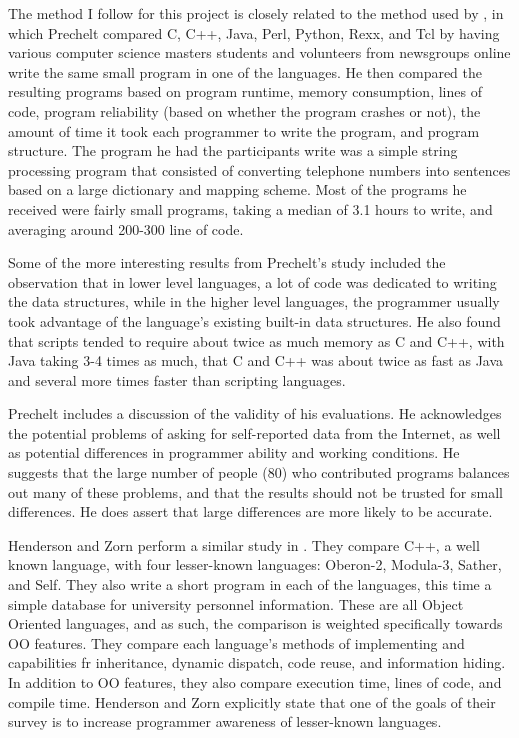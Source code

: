 \documentclass{article}
\begin{document}
The method I follow for this project is closely related to the method used by
\cite{Prechelt7LangComp}, in which Prechelt compared C, C++, Java, Perl, Python,
Rexx, and Tcl by having various computer science masters students and volunteers
from newsgroups online write the same small program in one of the languages.  He
then compared the resulting programs based on program runtime, memory
consumption, lines of code, program reliability (based on whether the program
crashes or not), the amount of time it took each programmer to write the
program, and program structure.  The program he had the participants write was a
simple string processing program that consisted of converting telephone numbers
into sentences based on a large dictionary and mapping scheme.  Most of the
programs he received were fairly small programs, taking a median of 3.1 hours to
write, and averaging around 200-300 line of code.

Some of the more interesting results from Prechelt's study included the
observation that in lower level languages, a lot of code was dedicated to
writing the data structures, while in the higher level languages, the programmer
usually took advantage of the language's existing built-in data structures.  He
also found that scripts tended to require about twice as much memory as C and
C++, with Java taking 3-4 times as much, that C and C++ was about twice as fast
as Java and several more times faster than scripting languages.

Prechelt includes a discussion of the validity of his evaluations.  He
acknowledges the potential problems of asking for self-reported data from the
Internet, as well as potential differences in programmer ability and working
conditions.  He suggests that the large number of people (80) who contributed
programs balances out many of these problems, and that the results should not be
trusted for small differences.  He does assert that large differences are more
likely to be accurate.

Henderson and Zorn perform a similar study in \cite{Henderson4OOLangComp}.  They
compare C++, a well known language, with four lesser-known languages: Oberon-2,
Modula-3, Sather, and Self.  They also write a short program in each of the
languages, this time a simple database for university personnel information.
These are all Object Oriented languages, and as such, the comparison is weighted
specifically towards OO features.  They compare each language's methods of
implementing and capabilities fr inheritance, dynamic dispatch, code reuse, and
information hiding.  In addition to OO features, they also compare execution
time, lines of code, and compile time.  Henderson and Zorn explicitly state that
one of the goals of their survey is to increase programmer awareness of
lesser-known languages.
\end{document}
